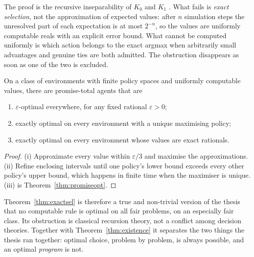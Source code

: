 The proof is the recursive inseparability of $K_0$ and $K_1$ \autocite[Thm.~II.2.5]{odifreddi1989}. What
fails is \emph{exact selection}, not the approximation of expected values: after $n$ simulation steps
the unresolved part of each expectation is at most $2^{-n}$, so the values are uniformly computable
reals with an explicit error bound. What cannot be computed uniformly is which action belongs to the
exact argmax when arbitrarily small advantages and genuine ties are both admitted. The obstruction
disappears as soon as one of the two is excluded.

\begin{proposition}\label{prop:approxopt}
On a class of environments with finite policy spaces and uniformly computable values, there are
promise-total agents that are
\begin{enumerate}[label=(\roman*)]
  \item $\varepsilon$-optimal everywhere, for any fixed rational $\varepsilon>0$;
  \item exactly optimal on every environment with a unique maximising policy;
  \item exactly optimal on every environment whose values are exact rationals.
\end{enumerate}
\end{proposition}

\begin{proof}
(i) Approximate every value within $\varepsilon/3$ and maximise the approximations. (ii) Refine
enclosing intervals until one policy's lower bound exceeds every other policy's upper bound, which
happens in finite time when the maximiser is unique. (iii) is Theorem~\ref{thm:promiseopt}.
\end{proof}

Theorem~\ref{thm:exactsel} is therefore a true and non-trivial version of the thesis that no
computable rule is optimal on all fair problems, on an especially fair class. Its obstruction is
classical recursion theory, not a conflict among decision theories. Together with
Theorem~\ref{thm:existence} it separates the two things the thesis ran together: optimal choice,
problem by problem, is always possible, and an optimal \emph{program} is not.
